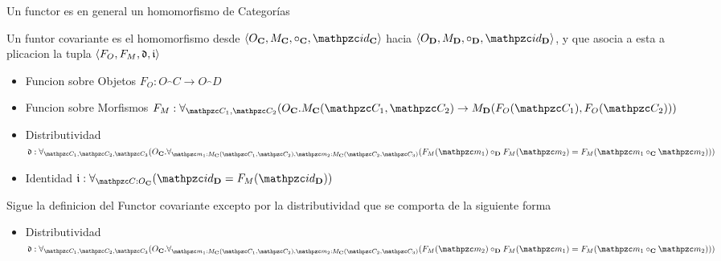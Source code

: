 \begin{defn}[Functor]
Un functor es en general un homomorfismo de Categorías 
\end{defn}

\begin{defn}
\end{defn}
Un funtor covariante es el homomorfismo desde $\langle O_\cat{C}, M_\cat{C}, \circ_\cat{C}, \id_\cat{C} \rangle$ hacia $\langle O_\cat{D}, M_\cat{D}, \circ_\cat{D}, \id_\cat{D} \rangle$, y que asocia a esta a plicacion la tupla $\langle F_O, F_M, \mathfrak{d}, \mathfrak{i} \rangle$  
\begin{itemize}
\item Funcion sobre Objetos $F_O : O_\cat{C} \to O_\cat{D}$
\item Funcion sobre Morfismos $F_M : 
\forall_{\ob{C}_1, \ob{C}_2}(O_\cat{C}. M_\cat{C}(\ob{C}_1, \ob{C}_2) \to M_\cat{D}(F_O(\ob{C}_1), F_O(\ob{C}_2)))$
\item Distributividad \\
$\mft{d}: 
\forall_{\ob{C}_1, \ob{C}_2, \ob{C}_3} 
( O_\cat{C} . \forall_{ \mo{m}_1 : M_\cat{C}(\ob{C}_1, \ob{C}_2), \mo{m}_2 : M_\cat{C}(\ob{C}_2, \ob{C}_3)} ( F_M(\mo{m}_1) \circ_\cat{D} F_M(\mo{m}_2) = F_M(\mo{m}_1 \circ_\cat{C} \mo{m}_2)))$
\item Identidad $\mft{i} : \forall_{ \ob{C} : O_\cat{C}}( \id_\cat{D} = F_M(\id_\cat{D}))$
\end{itemize}

\begin{defn}
Sigue la definicion del Functor covariante excepto por la distributividad que se comporta de la siguiente forma
\begin{itemize}
\item Distributividad \\
$\mft{d}: 
\forall_{\ob{C}_1, \ob{C}_2, \ob{C}_3} 
( O_\cat{C} . \forall_{ \mo{m}_1 : M_\cat{C}(\ob{C}_1, \ob{C}_2), \mo{m}_2 : M_\cat{C}(\ob{C}_2, \ob{C}_3)} ( F_M(\mo{m}_2) \circ_\cat{D} F_M(\mo{m}_1) = F_M(\mo{m}_1 \circ_\cat{C} \mo{m}_2)))$
\end{itemize}
\end{defn}